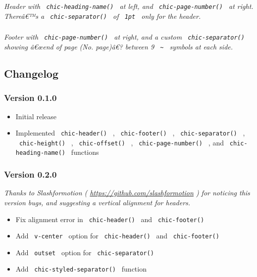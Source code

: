 \emph{Header with \texttt{\ chic-heading-name()\ } at left, and
\texttt{\ chic-page-number()\ } at right. Thereâ€™s a
\texttt{\ chic-separator()\ } of \texttt{\ 1pt\ } only for the header.}

\subsubsection{\texorpdfstring{\protect{}}{Example 2}}\label{example-2}

\emph{Footer with \texttt{\ chic-page-number()\ } at right, and a custom
\texttt{\ chic-separator()\ } showing â€œend of page (No. page)â€?
between 9 \texttt{\ \textasciitilde{}\ } symbols at each side.}

\subsection{Changelog}\label{changelog}

\subsubsection{Version 0.1.0}\label{version-0.1.0}

\begin{itemize}
\tightlist
\item
  Initial release
\item
  Implemented \texttt{\ chic-header()\ } , \texttt{\ chic-footer()\ } ,
  \texttt{\ chic-separator()\ } , \texttt{\ chic-height()\ } ,
  \texttt{\ chic-offset()\ } , \texttt{\ chic-page-number()\ } , and
  \texttt{\ chic-heading-name()\ } functions
\end{itemize}

\subsubsection{Version 0.2.0}\label{version-0.2.0}

\emph{Thanks to Slashformotion ( \url{https://github.com/slashformotion}
) for noticing this version bugs, and suggesting a vertical alignment
for headers.}

\begin{itemize}
\tightlist
\item
  Fix alignment error in \texttt{\ chic-header()\ } and
  \texttt{\ chic-footer()\ }
\item
  Add \texttt{\ v-center\ } option for \texttt{\ chic-header()\ } and
  \texttt{\ chic-footer()\ }
\item
  Add \texttt{\ outset\ } option for \texttt{\ chic-separator()\ }
\item
  Add \texttt{\ chic-styled-separator()\ } function
\end{itemize}

